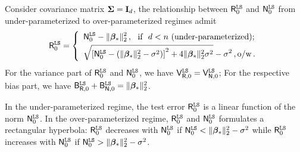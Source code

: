 \begin{corollary}\label{prop:relation_minnorm_id}
    Consider covariance matrix ${\boldsymbol \Sigma} = {\mathbf I}_d$, the relationship between $\mathsf R^{\tt LS}_0$ and $\mathsf N^{\tt LS}_0$ from under-parameterized to over-parameterized regimes admit
    \begin{equation*}
		\mathsf R^{\tt LS}_0 = \left\{
		\begin{array}{rcl}
			\begin{aligned}
				&  \mathsf N^{\tt LS}_0 - \|{\boldsymbol \beta}_*\|_2^2\,,  ~~\text{if}~~ d<n ~\mbox{(under-parameterized)} ; \\
				& \sqrt{\left[\mathsf N^{\tt LS}_0 - (\|{\boldsymbol \beta}_*\|_2^2 - \sigma^2)\right]^2 + 4\|{\boldsymbol \beta}_*\|_2^2 \sigma^2 } - \sigma^2 \,, \mbox{o/w}\,.
			\end{aligned}
		\end{array} \right.
    \end{equation*}
    For the variance part of $\mathsf R^{\tt LS}_0$ and $\mathsf N^{\tt LS}_0$, we have $\mathsf V_{\mathsf R,0}^{\tt LS} = \mathsf V_{\mathsf N,0}^{\tt LS}$; For the respective bias part, we have $\mathsf B_{\mathsf R,0}^{\tt LS} + \mathsf B_{\mathsf N,0}^{\tt LS} = \| \bm \beta_* \|_2^2$.
\end{corollary}
In the under-parameterized regime, the test error $\mathsf R^{\tt LS}_0$ is a linear function of the norm $\mathsf N^{\tt LS}_0$. 
In the over-parameterized regime, $\mathsf R^{\tt LS}_0$ and $\mathsf N^{\tt LS}_0$ formulates a rectangular hyperbola: $\mathsf R^{\tt LS}_0$ decreases with $\mathsf N^{\tt LS}_0$ if $\mathsf N^{\tt LS}_0 < \|{\boldsymbol \beta}_*\|_2^2 - \sigma^2$ while $\mathsf R^{\tt LS}_0$ increases with $\mathsf N^{\tt LS}_0$ if $\mathsf N^{\tt LS}_0 > \|{\boldsymbol \beta}_*\|_2^2 - \sigma^2$.

